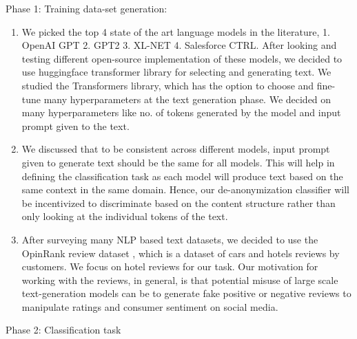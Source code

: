 \documentclass[11pt,letterpaper]{article}
\begin{document}
Phase 1: Training data-set generation:
        \begin{enumerate}
                \item We picked the top 4 state of the art language models in the literature, 1. OpenAI GPT 2. GPT2 3. XL-NET 4. Salesforce CTRL. After looking and testing different open-source implementation of these models, we decided to use huggingface transformer library \cite{Wolf2019HuggingFacesTS} for selecting and generating text. We studied the Transformers library, which has the option to choose and fine-tune many hyperparameters at the text generation phase. We decided on many hyperparameters like no. of tokens generated by the model and input prompt given to the text.
                \item We discussed that to be consistent across different models, input prompt given to generate text should be the same for all models. This will help in defining the classification task as each model will produce text based on the same context in the same domain. Hence, our de-anonymization classifier will be incentivized to discriminate based on the content structure rather than only looking at the individual tokens of the text.
                \item After surveying many NLP based text datasets, we decided to use the OpinRank review dataset \cite{ganesan2012opinion}, which is a dataset of cars and hotels reviews by customers. We focus on hotel reviews for our task. Our motivation for working with the reviews, in general, is that potential misuse of large scale text-generation models can be to generate fake positive or negative reviews to manipulate ratings and consumer sentiment on social media. 
        \end{enumerate}
Phase 2: Classification task
\end{document}
